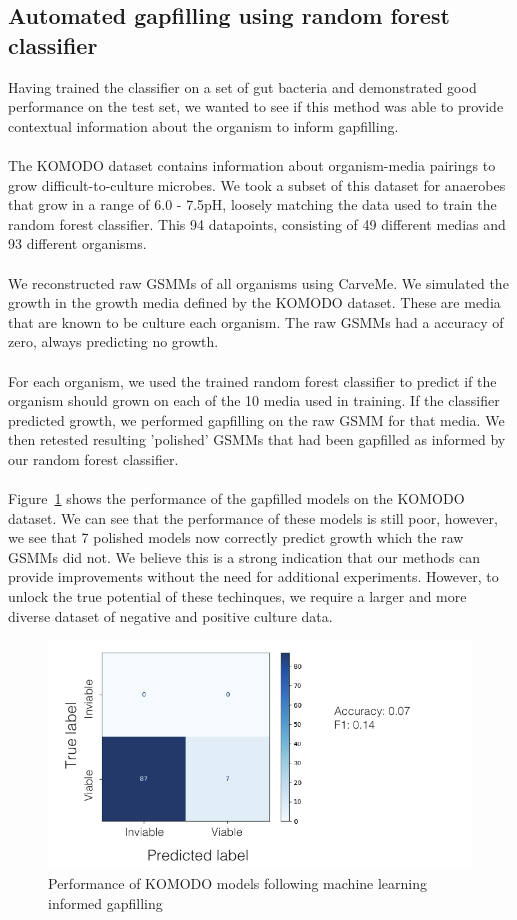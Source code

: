 \documentclass[11pt,a4paper]{article}
\begin{document}
\subsection*{Automated gapfilling using random forest classifier}
Having trained the classifier on a set of gut bacteria and demonstrated good performance on the test set, we wanted to see if this method was able to provide contextual information about the organism to inform gapfilling.
\\\\
The KOMODO dataset contains information about organism-media pairings to grow difficult-to-culture microbes. We took a subset of this dataset for anaerobes that grow in a range of 6.0 - 7.5pH, loosely matching the data used to train the random forest classifier. This 94 datapoints, consisting of 49 different medias and 93 different organisms. 
\\\\
We reconstructed raw GSMMs of all organisms using CarveMe. We simulated the growth in the growth media defined by the KOMODO dataset. These are media that are known to be culture each organism. The raw GSMMs had a accuracy of zero, always predicting no growth.
\\\\
For each organism, we used the trained random forest classifier to predict if the organism should grown on each of the 10 media used in training. If the classifier predicted growth, we performed gapfilling on the raw GSMM for that media. We then retested resulting 'polished' GSMMs that had been gapfilled as informed by our random forest classifier. 
\\\\
Figure~\ref{fig:FIG_komodo_gapfill} shows the performance of the gapfilled models on the KOMODO dataset. We can see that the performance of these models is still poor, however, we see that 7 polished models now correctly predict growth which the raw GSMMs did not. We believe this is a strong indication that our methods can provide improvements without the need for additional experiments. However, to unlock the true potential of these techinques, we require a larger and more diverse dataset of negative and positive culture data.

\begin{figure}[tbp]
    \includegraphics[width=\textwidth]{figures/FIG_komodo_gapfill/FIG_komodo_gapfill.pdf}
    \caption{Performance of KOMODO models following machine learning informed gapfilling}
    \label{fig:FIG_komodo_gapfill}
\end{figure}
\end{document}
